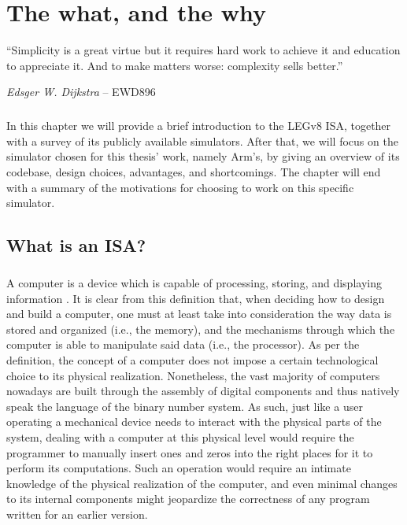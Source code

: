 \chapter{The what, and the why}\label{chap:chap1}

\epigraph{``Simplicity is a great virtue but it requires hard work to achieve it and education to appreciate it. And to make matters worse: complexity sells better.''}{\textit{Edsger W. Dijkstra} -- EWD896}

\paragraph{}
In this chapter we will provide a brief introduction to the LEGv8 ISA, together with a survey of its publicly available simulators. After that, we will focus on the simulator chosen for this thesis' work, namely Arm's, by giving an overview of its codebase, design choices, advantages, and shortcomings. The chapter will end with a summary of the motivations for choosing to work on this specific simulator. 

\section{What is an ISA?}

\paragraph{}
A computer is a device which is capable of processing, storing, and displaying information \cite{computerdefweb}.
It is clear from this definition that, when deciding how to design and build a computer, one must at least take into consideration the way data is 
stored and organized (i.e., the memory), and the mechanisms through which the computer is able to manipulate said data (i.e., the processor).
As per the definition, the concept of a computer does not impose a certain technological choice to its physical realization. Nonetheless, the vast majority of computers nowadays
are built through the assembly of digital components and thus natively speak the language of the binary number system.
As such, just like a user operating a mechanical device needs to interact with the physical parts of the system,  dealing with a computer at this physical level
would require the programmer to manually insert ones and zeros into the right places for it to perform its computations.
Such an operation would require an intimate knowledge of the physical realization of the computer, and even minimal
changes to its internal components might jeopardize the correctness of any program written for an earlier version.
